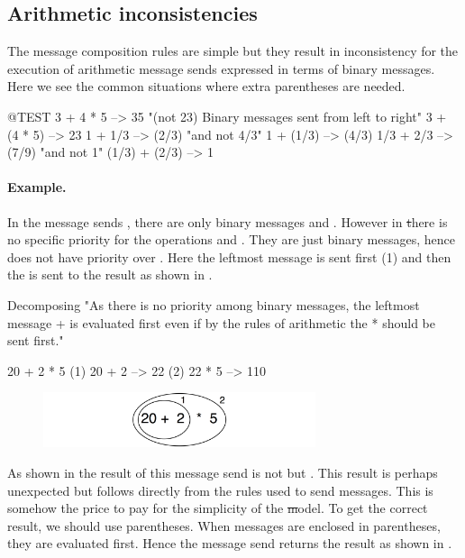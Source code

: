 \documentclass[a4paper,10pt,twoside]{book}
\begin{document}
\subsection{Arithmetic inconsistencies}
The message composition rules are simple but they result in inconsistency for the execution of arithmetic message sends expressed in terms of binary messages. Here we see the common situations where extra parentheses are needed. 

\begin{code}{@TEST}
3 + 4 * 5      --> 35    "(not 23)  Binary messages sent from left to right"
3 + (4 * 5)    --> 23
1 + 1/3         --> (2/3)    "and not 4/3"
1 + (1/3)       --> (4/3)
1/3 + 2/3       --> (7/9)    "and not 1"
(1/3) + (2/3)  --> 1
\end{code}

\paragraph{Example.} 
In the message sends , there are only binary messages \ct{+} and \ct{*}. However in \st there is no specific priority for the operations \ct{+} and \ct{*}. They are just binary messages, hence \ct{*} does not have priority over \ct{+}. Here the leftmost message \ct{+} is sent first (1) and then the \ct{*} is sent to the result as shown in .  

\begin{example}[binaryMessages1]{Decomposing }{}
"As there is no priority among binary messages, the leftmost message + is evaluated first even if by the rules of arithmetic the * should be sent first."

      20 + 2 * 5 
(1)  20 + 2 --> 22
(2)  22       * 5 --> 110
\end{example}

\begin{figure}
\begin{center}\includegraphics[width=8cm]{ucompoNoBracketPar}\end{center}
\end{figure}
\noindent
As shown in  the result of this message send is not  but . This result is perhaps unexpected but follows directly from the rules used to send messages. This is somehow the price to pay for the simplicity of the \st model. To get the correct result, we should use parentheses. When messages are enclosed in parentheses, they are evaluated first. Hence the message send  returns the result as shown in .
\end{document}

